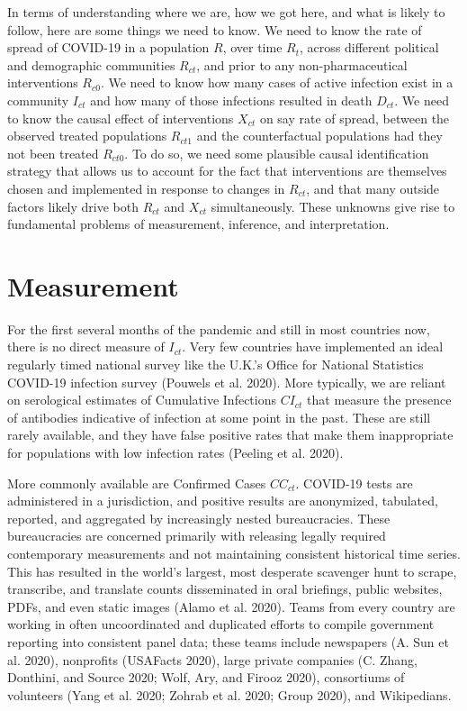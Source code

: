 \documentclass[10pt,letterpaper]{article}
\begin{document}
In terms of understanding where we are, how we got here, and what is
likely to follow, here are some things we need to know. We need to know
the rate of spread of COVID-19 in a population \(R\), over time
\(R_{t}\), across different political and demographic communities
\(R_{ct}\), and prior to any non-pharmaceutical interventions
\(R_{c0}\). We need to know how many cases of active infection exist in
a community \(I_{ct}\) and how many of those infections resulted in
death \(D_{ct}\). We need to know the causal effect of interventions
\(X_{ct}\) on say rate of spread, between the observed treated
populations \(R_{ct1}\) and the counterfactual populations had they not
been treated \(R_{ct0}\). To do so, we need some plausible causal
identification strategy that allows us to account for the fact that
interventions are themselves chosen and implemented in response to
changes in \(R_{ct}\), and that many outside factors likely drive both
\(R_{ct}\) and \(X_{ct}\) simultaneously. These unknowns give rise to
fundamental problems of measurement, inference, and interpretation.

\section{Measurement}\label{measurement}

For the first several months of the pandemic and still in most countries
now, there is no direct measure of \(I_{ct}\). Very few countries have
implemented an ideal regularly timed national survey like the U.K.'s
Office for National Statistics COVID-19 infection survey (Pouwels et al.
2020). More typically, we are reliant on serological estimates of
Cumulative Infections \(CI_{ct}\) that measure the presence of
antibodies indicative of infection at some point in the past. These are
still rarely available, and they have false positive rates that make
them inappropriate for populations with low infection rates (Peeling et
al. 2020).

More commonly available are Confirmed Cases \(CC_{ct}\). COVID-19 tests
are administered in a jurisdiction, and positive results are anonymized,
tabulated, reported, and aggregated by increasingly nested
bureaucracies. These bureaucracies are concerned primarily with
releasing legally required contemporary measurements and not maintaining
consistent historical time series. This has resulted in the world's
largest, most desperate scavenger hunt to scrape, transcribe, and
translate counts disseminated in oral briefings, public websites, PDFs,
and even static images (Alamo et al. 2020). Teams from every country are
working in often uncoordinated and duplicated efforts to compile
government reporting into consistent panel data; these teams include
newspapers (A. Sun et al. 2020), nonprofits (USAFacts 2020), large
private companies (C. Zhang, Donthini, and Source 2020; Wolf, Ary, and
Firooz 2020), consortiums of volunteers (Yang et al. 2020; Zohrab et al.
2020; Group 2020), and Wikipedians.
\end{document}
